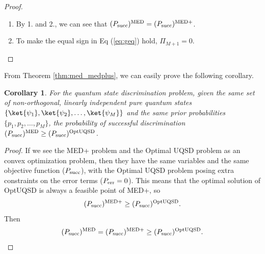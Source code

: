\documentclass[11pt]{article}
\newtheorem{corollary}{Corollary}
\newcommand{\psucc}{P_{\textnormal{succ}}}
\newcommand{\perr}{P_{\textnormal{err}}}
\newcommand{\povm}[1]{\textnormal{POVM}_{\textnormal{#1}}}
\newcommand{\PiSetPrime}[1]{\left\{ \Pi_1', \Pi_2', \dots, \Pi_{#1}' \right\}}
\newcommand{\supmed}{^{\textnormal{MED}}}
\newcommand{\supmedplus}{^{\textnormal{MED+}}}
\newcommand{\supuqsd}{^{\textnormal{OptUQSD}}}
\begin{document}
\begin{proof}
\begin{enumerate}
              We can construct $P \equiv \PiSetPrime{M} \in \povm{M}$ by
              \begin{align*}
                  \Pi_{1}' = \Pi_{1}, \; \Pi_{2}' = \Pi_{2}, \; \dots,
                  \; \Pi_{M}' = \Pi_{M} + \Pi_{M+1}
              \end{align*}
              Then,
              \begin{align}
                  (\psucc)\supmed & \geq (\psucc)^{P}
                  = \sum_{i=1}^{M} p_{i} \operatorname{tr}(\rho_{i} \Pi_{i}')                           \\
                                  & = \sum_{i=1}^{M} p_{i} \operatorname{tr}(\rho_{i} \Pi_{i})
                  + p_{M} \operatorname{tr}(\rho_{i} \Pi_{M+1})                                         \\
                                  & = (\psucc)\supmedplus + p_{M} \operatorname{tr}(\rho_{i} \Pi_{M+1}) \\
                                  & \geq (\psucc)\supmedplus \label{eq:geq}
              \end{align}
        \item By 1. and 2., we can see that $(\psucc)\supmed = (\psucc)\supmedplus$.
        \item To make the equal sign in Eq (\ref{eq:geq}) hold, $\Pi_{M+1} = 0$.
    \end{enumerate}
\end{proof}

From Theorem \ref{thm:med_medplus}, we can easily prove the
following corollary.
\begin{corollary}
    For the quantum state discrimination problem, given the same set of
    non-orthogonal, linearly independent pure quantum states\\
    $\{ \ket{\psi_{1}}, \ket{\psi_{2}}, \dots, \ket{\psi_{M}} \}$
    and the same prior probabilities $\{p_{1}, p_{2}, \dots, p_{M}\}$,
    the probability of successful discrimination
    $(\psucc)\supmed \geq (\psucc)\supuqsd$.
\end{corollary}

\begin{proof}
    If we see the MED+ problem and the Optimal UQSD problem as an convex
    optimization problem, then they have the same variables and the same
    objective function ($\psucc$), with the Optimal UQSD problem posing extra
    constraints on the error terms ($\perr = 0$).
    This means that the optimal solution of OptUQSD is always a feasible point
    of MED+, so
    \begin{align}
        (\psucc)\supmedplus \geq (\psucc)\supuqsd.
    \end{align}
    Then
    \begin{align}
        (\psucc)\supmed = (\psucc)\supmedplus \geq (\psucc)\supuqsd.
    \end{align}
\end{proof}
\end{document}
